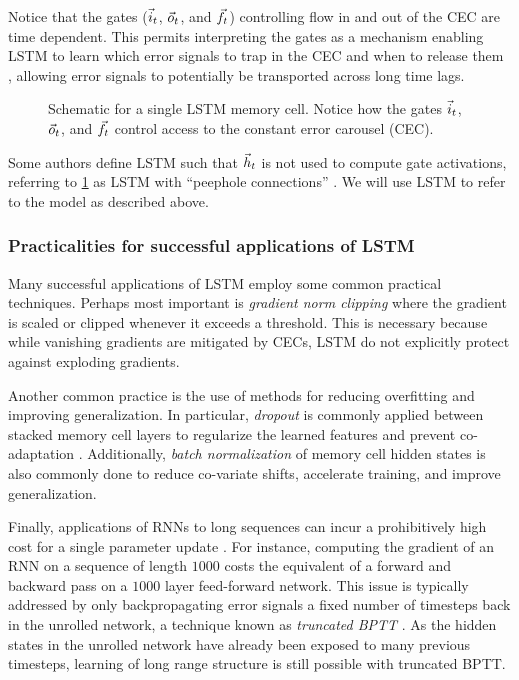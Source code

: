 Notice that the gates ($\vec{i}_t$, $\vec{o}_t$, and $\vec{f}_t$) controlling flow in and out
of the CEC are time dependent. This permits interpreting the gates as a
mechanism enabling LSTM to learn which error signals to trap in the CEC and
when to release them \citep{hochreiter1997long}, allowing error signals to
potentially be transported across long time lags.

\begin{figure}[tb]
    \centering
    
    \caption{Schematic for a single LSTM memory cell. Notice how the gates $\vec{i}_t$, $\vec{o}_t$, and $\vec{f}_t$ control access to the constant error carousel (CEC).}
    \label{fig:lstm-cell}
\end{figure}

Some authors define LSTM such that $\vec{h}_t$ is not used to compute gate
activations, referring to \cref{fig:lstm-cell} as LSTM with ``peephole
connections'' \citep{gers2000recurrent}. We will use LSTM to refer to the
model as described above.

\subsubsection{Practicalities for successful applications of LSTM}

Many successful applications of LSTM
\citep{devlin2014fast,zaremba2015empirical,pascanu2013construct} employ some
common practical techniques. Perhaps most important is \emph{gradient norm
clipping} \citep{Mikolov2012,Pascanu2012} where the gradient is scaled or
clipped whenever it exceeds a threshold. This is necessary because while
vanishing gradients are mitigated by CECs, LSTM do not explicitly protect
against exploding gradients.

Another common practice is the use of methods for reducing overfitting and
improving generalization. In particular, \emph{dropout}
\citep{hinton2012improving} is commonly applied between stacked memory cell
layers to regularize the learned features and prevent co-adaptation
\citep{zaremba2014recurrent}. Additionally, \emph{batch normalization}
\citep{ioffe2015batch} of memory cell hidden states is also commonly done to
reduce co-variate shifts, accelerate training, and improve generalization.

Finally, applications of RNNs to long sequences can incur a prohibitively high
cost for a single parameter update \citep{citeulike:13881859}. For instance,
computing the gradient of an RNN on a sequence of length $1000$ costs the
equivalent of a forward and backward pass on a $1000$ layer feed-forward
network. This issue is typically addressed by only backpropagating error
signals a fixed number of timesteps back in the unrolled network, a technique
known as \emph{truncated BPTT} \citep{williams1990efficient}. As the hidden
states in the unrolled network have already been exposed to many previous
timesteps, learning of long range structure is still possible with truncated
BPTT.


